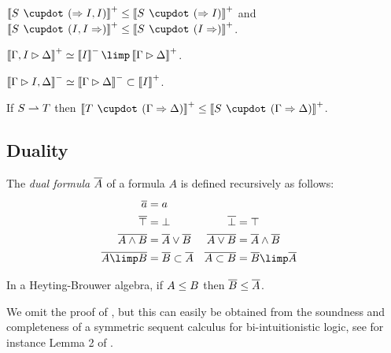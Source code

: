 \begin{lemma}[Contraction]
  $\psint{S \mix (\seq I, I)} \sement \psint{S \mix (\seq I)}$ and
  $\psint{S \mix (I, I \seq)} \sement \psint{S \mix (I \seq)}$.
\end{lemma}

\begin{lemma}[Currying]
  $\psint{\Gamma, I \J \Delta} \semequiv \nsint{I} \limp \psint{\Gamma \J
  \Delta}$.
\end{lemma}

\begin{lemma}[Co-currying]
  $\left\llbracket \Gamma \mathbin{\rhd} I, \Delta \right\rrbracket^- \simeq \left\llbracket \Gamma \mathbin{\rhd} \Delta \right\rrbracket^- \subset
  \left\llbracket I \right\rrbracket^+$.
\end{lemma}

\begin{lemma}
  
  If $S \rightharpoonup T$ then $\psint{T \mix (\Gamma \seq \Delta)} \sement \psint{S
  \mix (\Gamma \seq \Delta)}$.
\end{lemma}

\subsection{Duality}

\begin{definition}
  The \emph{dual formula} $\overline{A}$ of a formula $A$ is defined recursively
  as follows:
  \begin{align*}
    \soldual{a} &= a &\\
    \soldual{\top} &= \bot &
    \soldual{\bot} &= \top \\
    \soldual{A \land B} &= \soldual{A} \lor \soldual{B} &
    \soldual{A \lor B} &= \soldual{A} \land \soldual{B} \\
    \soldual{A \limp B} &= \soldual{B} \lsub \soldual{A} &
    \soldual{A \lsub B} &= \soldual{B} \limp \soldual{A}
  \end{align*}
\end{definition}

\begin{fact}[Duality]
  In a Heyting-Brouwer algebra, if $A \leq B$ then $\overline{B} \leq
  \overline{A}$.
\end{fact}

We omit the proof of , but this can easily be obtained from the
soundness and completeness of a symmetric sequent calculus for bi-intuitionistic
logic, see for instance Lemma 2 of .


